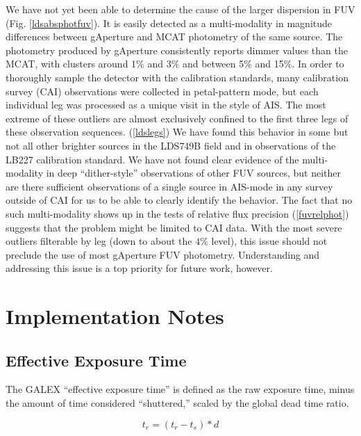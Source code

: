 \documentclass[preprint]{aastex}
\begin{document}
We have not yet been able to determine the cause of the larger dispersion in FUV (Fig. \ref{ldsabsphotfuv}). It is easily detected as a multi-modality in magnitude differences between gAperture and MCAT photometry of the same source. The photometry produced by gAperture consistently reports dimmer values than the MCAT, with clusters around 1\% and 3\% and between 5\% and 15\%. In order to thoroughly sample the detector with the calibration standards, many calibration survey (CAI) observations were collected in petal-pattern mode, but each individual leg was processed as a unique visit in the style of AIS. The most extreme of these outliers are almost exclusively confined to the first three legs of these observation sequences. (\ref{ldslegs}) We have found this behavior in some but not all other brighter sources in the LDS749B field and in observations of the LB227 calibration standard. We have not found clear evidence of the multi-modality in deep ``dither-style'' observations of other FUV sources, but neither are there sufficient observations of a single source in AIS-mode in any survey outside of CAI for us to be able to clearly identify the behavior. The fact that no such multi-modality shows up in the tests of relative flux precision (\ref{fuvrelphot}) suggests that the problem might be limited to CAI data. With the most severe outliers filterable by leg (down to about the $4$\% level), this issue should not preclude the use of most gAperture FUV photometry. Understanding and addressing this issue is a top priority for future work, however.

\section{Implementation Notes}
\label{implementation}

\subsection{Effective Exposure Time}
\label{effexptime}
The GALEX ``effective exposure time'' is defined as the raw exposure time, minus the amount of time considered ``shuttered,'' scaled by the global dead time ratio.

\[t_e=(t_r-t_s)*d\]
\end{document}
